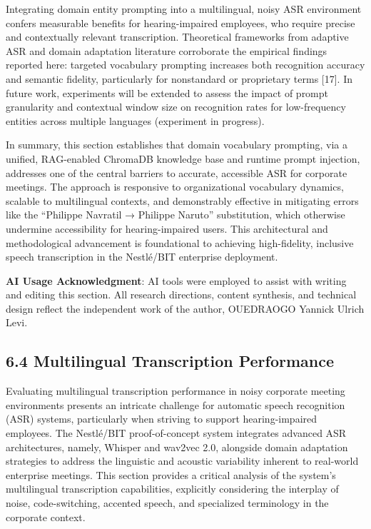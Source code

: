 \documentclass[12pt,a4paper]{article}
\begin{document}
Integrating domain entity prompting into a multilingual, noisy ASR environment confers measurable benefits for hearing-impaired employees, who require precise and contextually relevant transcription. Theoretical frameworks from adaptive ASR and domain adaptation literature corroborate the empirical findings reported here: targeted vocabulary prompting increases both recognition accuracy and semantic fidelity, particularly for nonstandard or proprietary terms [17]. In future work, experiments will be extended to assess the impact of prompt granularity and contextual window size on recognition rates for low-frequency entities across multiple languages (experiment in progress).


In summary, this section establishes that domain vocabulary prompting, via a unified, RAG-enabled ChromaDB knowledge base and runtime prompt injection, addresses one of the central barriers to accurate, accessible ASR for corporate meetings. The approach is responsive to organizational vocabulary dynamics, scalable to multilingual contexts, and demonstrably effective in mitigating errors like the “Philippe Navratil → Philippe Naruto” substitution, which otherwise undermine accessibility for hearing-impaired users. This architectural and methodological advancement is foundational to achieving high-fidelity, inclusive speech transcription in the Nestlé/BIT enterprise deployment.


\textbf{AI Usage Acknowledgment}: AI tools were employed to assist with writing and editing this section. All research directions, content synthesis, and technical design reflect the independent work of the author, OUEDRAOGO Yannick Ulrich Levi.


\subsection{6.4 Multilingual Transcription Performance}


Evaluating multilingual transcription performance in noisy corporate meeting environments presents an intricate challenge for automatic speech recognition (ASR) systems, particularly when striving to support hearing-impaired employees. The Nestlé/BIT proof-of-concept system integrates advanced ASR architectures, namely, Whisper and wav2vec 2.0, alongside domain adaptation strategies to address the linguistic and acoustic variability inherent to real-world enterprise meetings. This section provides a critical analysis of the system’s multilingual transcription capabilities, explicitly considering the interplay of noise, code-switching, accented speech, and specialized terminology in the corporate context.
\end{document}
